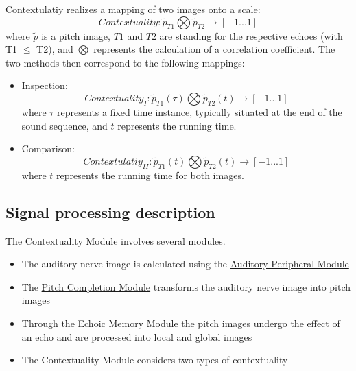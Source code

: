 Contextulatiy realizes a mapping of two images onto a scale:
\begin{equation}
Contextuality: \tilde{p}_{T1} \bigotimes \tilde{p}_{T2} \rightarrow [-1 ... 1]
\end{equation}
where $\tilde{p}$ is a pitch image,
$T1$ and $T2$ are standing for the respective echoes (with T1 $\leq$ T2),
and $\bigotimes$ represents the calculation of a correlation coefficient.
The two methods then correspond to the following mappings:
\begin{itemize}
\item{Inspection:}
    \begin{displaymath}
    Contextuality_{I}: \tilde{p}_{T1}(\tau) \bigotimes \tilde{p}_{T2}(t) \rightarrow [-1 ...
    1]
    \end{displaymath}
    where $\tau$ represents a fixed time instance, typically situated at the end of the
    sound sequence, and $t$ represents the running time.
\item{Comparison:}
    \begin{displaymath}
    Contextulatiy_{II}: \tilde{p}_{T1}(t) \bigotimes \tilde{p}_{T2}(t) \rightarrow [-1 ...
    1]
    \end{displaymath}
    where $t$ represents the running time for both images.
\end{itemize}


\subsection{Signal processing description}

The Contextuality Module involves several modules.
\begin{itemize}
\item
    The auditory nerve image is calculated using the
    \hyperlink{Concepts:AuditoryPeripheralModule}{Auditory Peripheral
    Module}
\item
    The \hyperlink{Concepts:PitchCompletionModule}{Pitch Completion
    Module} transforms the auditory nerve image into pitch images
\item
    Through the \hyperlink{Concepts:EchoicMemoryModule}{Echoic Memory
    Module} the pitch images undergo the effect of an echo and are
    processed into local and global images
\item
    The Contextuality Module considers two types of contextuality
\end{itemize}


